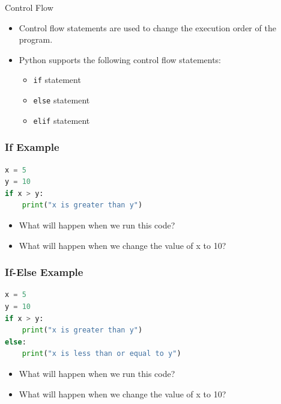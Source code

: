 \documentclass[aspectratio=169]{beamer}
\begin{document}
\begin{frame}{Control Flow}
    \begin{itemize}
        \item Control flow statements are used to change the execution order of the program.
        \item Python supports the following control flow statements:
              \begin{itemize}
                  \item \texttt{if} statement
                  \item \texttt{else} statement
                  \item \texttt{elif} statement
              \end{itemize}
    \end{itemize}
\end{frame}

\begin{frame}[fragile]
    \frametitle{If Example}
    \begin{lstlisting}[language=Python, caption={If Statement}]
x = 5
y = 10
if x > y:
    print("x is greater than y")
    \end{lstlisting}

    \begin{itemize}
        \item What will happen when we run this code?
        \item What will happen when we change the value of x to 10?
    \end{itemize}
\end{frame}

\begin{frame}[fragile]
    \frametitle{If-Else Example}
    \begin{lstlisting}[language=Python, caption={If-Else Statement}]
x = 5
y = 10
if x > y:
    print("x is greater than y")
else:
    print("x is less than or equal to y")
    \end{lstlisting}

    \begin{itemize}
        \item What will happen when we run this code?
        \item What will happen when we change the value of x to 10?
    \end{itemize}
\end{frame}
\end{document}
